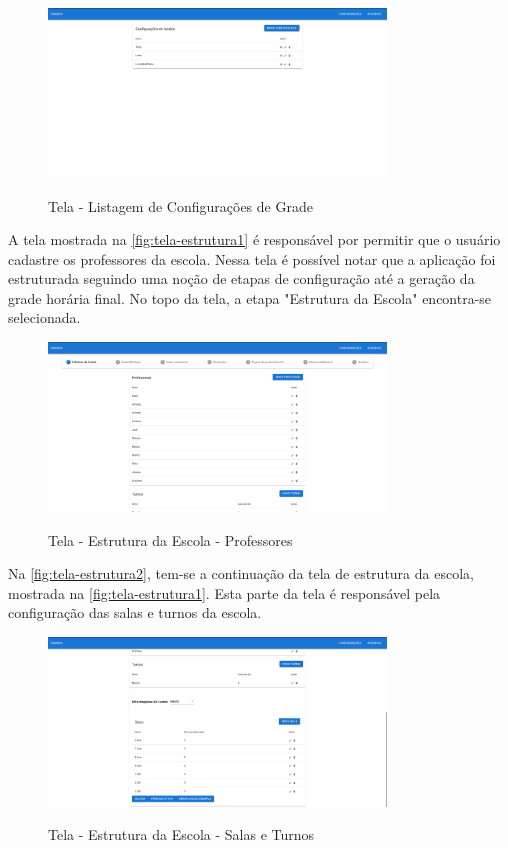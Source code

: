 \begin{figure}[!htb]
	\centering
	\caption{Tela - Listagem de Configurações de Grade}
	\includegraphics[width=0.8\textwidth]{./dados/figuras/tela_configuracoes}
	\label{fig:tela-configuracoes}
\end{figure}
\pagebreak

A tela mostrada na \autoref{fig:tela-estrutura1} é responsável por permitir que o usuário cadastre os professores da escola. Nessa tela é possível notar que a aplicação foi estruturada seguindo uma noção de etapas de configuração até a geração da grade horária final. No topo da tela, a etapa "Estrutura da Escola" encontra-se selecionada.

\begin{figure}[!htb]
	\centering
	\caption{Tela - Estrutura da Escola - Professores}
	\includegraphics[width=0.8\textwidth]{./dados/figuras/tela_estrutura1}
	\label{fig:tela-estrutura1}
\end{figure}
\newpage

Na \autoref{fig:tela-estrutura2}, tem-se a continuação da tela de estrutura da escola, mostrada na \autoref{fig:tela-estrutura1}. Esta parte da tela é responsável pela configuração das salas e turnos da escola.

\begin{figure}[!htb]
	\centering
	\caption{Tela - Estrutura da Escola - Salas e Turnos}
	\includegraphics[width=0.8\textwidth]{./dados/figuras/tela_estrutura2}
	\label{fig:tela-estrutura2}
\end{figure}

